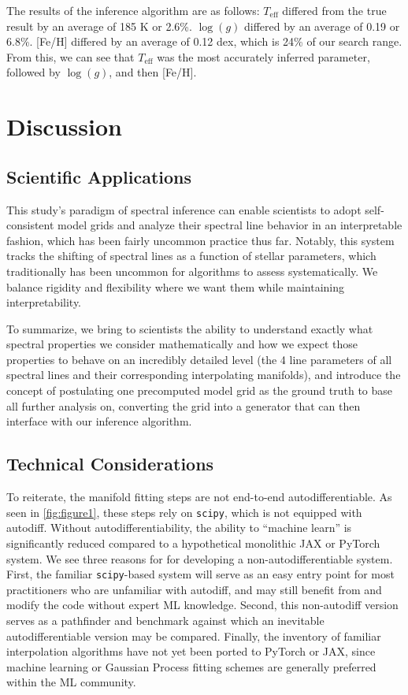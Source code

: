 \documentclass[twocolumn, linenumbers]{aastex631}
\begin{document}
The results of the inference algorithm are as follows: $T_{\mathrm{eff}}$ differed from the true result by an average of 185 K or 2.6\%. 
$\log(g)$ differed by an average of 0.19 or 6.8\%. [Fe/H] differed by an average of 0.12 dex, which is 24\% of our search range.
From this, we can see that $T_{\mathrm{eff}}$ was the most accurately inferred parameter, followed by $\log(g)$, and then [Fe/H].

\section{Discussion}
\subsection{Scientific Applications}
This study's paradigm of spectral inference can enable scientists to adopt self-consistent model grids and analyze their spectral line behavior in an interpretable fashion, which has been fairly uncommon practice thus far.
Notably, this system tracks the shifting of spectral lines as a function of stellar parameters, which traditionally has been uncommon for algorithms to assess systematically. 
We balance rigidity and flexibility where we want them while maintaining interpretability.

To summarize, we bring to scientists the ability to understand exactly what spectral properties we consider mathematically and how we expect those properties to behave on an incredibly detailed level (the 4 line parameters of all spectral lines and their corresponding interpolating manifolds), and introduce the concept of postulating one precomputed model grid as the ground truth to base all further analysis on, converting the grid into a generator that can then interface with our inference algorithm.

\subsection{Technical Considerations}
To reiterate, the manifold fitting steps are not end-to-end autodifferentiable.  
As seen in \autoref{fig:figure1}, these steps rely on \texttt{scipy}, which is not equipped with autodiff.  
Without autodifferentiability, the ability to ``machine learn'' is significantly reduced compared to a hypothetical monolithic JAX or PyTorch system.  
We see three reasons for for developing a non-autodifferentiable system.
First, the familiar \texttt{scipy}-based system will serve as an easy entry point for most practitioners who are unfamiliar with autodiff, and may still benefit from and modify the code without expert ML knowledge.  
Second, this non-autodiff version serves as a pathfinder and benchmark against which an inevitable autodifferentiable version may be compared. 
Finally, the inventory of familiar interpolation algorithms have not yet been ported to PyTorch or JAX, since machine learning or Gaussian Process fitting schemes are generally preferred within the ML community. 
\end{document}
